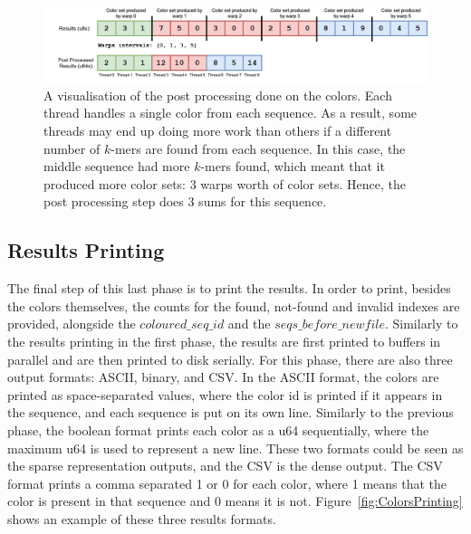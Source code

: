 \begin{figure}[t]
  \centering
  \includegraphics[width=\textwidth]{images/PostProcessing.png}
  \caption{A visualisation of the post processing done on the colors. Each thread handles a single color from each sequence. As a result, some threads may end up doing more work than others if a different number of $k$-mers are found from each sequence. In this case, the middle sequence had more $k$-mers found, which meant that it produced more color sets: 3 warps worth of color sets. Hence, the post processing step does 3 sums for this sequence.}\label{fig:PostProcessing}
\end{figure}

\subsection{Results Printing}\label{subs:ColorsPrinting}

The final step of this last phase is to print the results.
In order to print, besides the colors themselves, the counts for the found, not-found and invalid indexes are provided, alongside the $\mathit{coloured\_seq\_id}$ and the $\mathit{seqs\_before\_newfile}$.
Similarly to the results printing in the first phase, the results are first printed to buffers in parallel and are then printed to disk serially.
For this phase, there are also three output formats: ASCII, binary, and CSV.
In the ASCII format, the colors are printed as space-separated values, where the color id is printed if it appears in the sequence, and each sequence is put on its own line.
Similarly to the previous phase, the boolean format prints each color as a u64 sequentially, where the maximum u64 is used to represent a new line.
These two formats could be seen as the sparse representation outputs, and the CSV is the dense output.
The CSV format prints a comma separated 1 or 0 for each color, where 1 means that the color is present in that sequence and 0 means it is not.
Figure~\ref{fig:ColorsPrinting} shows an example of these three results formats.

